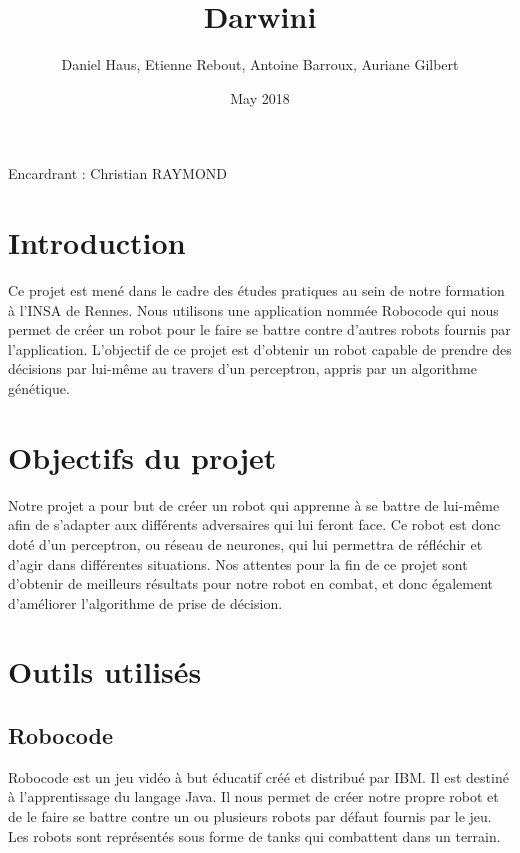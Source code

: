 \documentclass[12pt]{article}
\title{Darwini}
\author{Daniel Haus, Etienne Rebout, Antoine Barroux, Auriane Gilbert }
\date{May 2018}
\begin{document}
\maketitle
Encardrant : Christian RAYMOND

\newpage

\renewcommand{\contentsname}{Sommaire}
\tableofcontents

\newpage

\section{Introduction}

Ce projet est mené dans le cadre des études pratiques au sein de notre formation à l'INSA de Rennes. Nous utilisons une application nommée Robocode qui nous permet de créer un robot pour le faire se battre contre d'autres robots fournis par l'application. L'objectif de ce
projet est d'obtenir un robot capable de prendre des décisions par lui-même au
travers d'un perceptron, appris par un algorithme génétique.

\newpage

\section{Objectifs du projet}
Notre projet a pour but de créer un robot qui apprenne à se battre de lui-même afin de s'adapter aux différents adversaires qui lui feront face. Ce robot est donc doté d'un perceptron, ou réseau de neurones, qui lui permettra de réfléchir et d'agir dans différentes situations. Nos attentes pour la fin de ce projet sont d'obtenir de meilleurs résultats pour notre robot en combat, et donc également d'améliorer l'algorithme de prise de décision.


\newpage

\section{Outils utilisés}

\subsection{Robocode}
Robocode est un jeu vidéo à but éducatif créé et distribué par IBM. Il est destiné à l'apprentissage du langage Java. Il nous permet de créer notre propre robot et de le faire se battre contre un ou plusieurs robots par défaut fournis par le jeu. Les robots sont représentés sous forme de tanks qui combattent dans un terrain.
\end{document}
